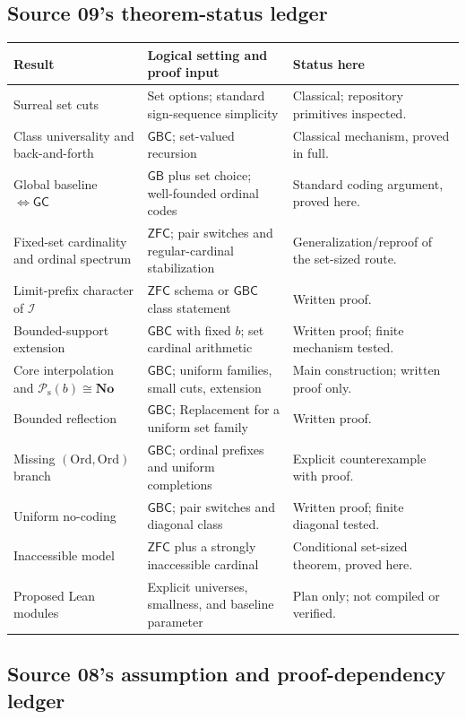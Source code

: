 \documentclass[11pt]{article}
\theoremstyle{definition}
\theoremstyle{remark}
\newcommand{\No}{\mathbf{No}}
\newcommand{\Ord}{\mathrm{Ord}}
\newcommand{\Words}{\mathcal I}
\newcommand{\Psupp}{\mathcal P_{\mathrm{s}}}
\newcommand{\GB}{\mathsf{GB}}
\newcommand{\GBC}{\mathsf{GBC}}
\newcommand{\ZFC}{\mathsf{ZFC}}
\newcommand{\GC}{\mathsf{GC}}
\begin{document}
\subsection{Source 09's theorem-status ledger}
{\small
\begin{longtable}{@{}p{}p{}p{}@{}}
\toprule
Result & Logical setting and proof input & Status here\\
\midrule\endhead
Surreal set cuts & Set options; standard sign-sequence simplicity & Classical; repository primitives inspected.\\
Class universality and back-and-forth & $\GBC$; set-valued recursion & Classical mechanism, proved in full.\\
Global baseline $\Leftrightarrow\GC$ & $\GB$ plus set choice; well-founded ordinal codes & Standard coding argument, proved here.\\
Fixed-set cardinality and ordinal spectrum & $\ZFC$; pair switches and regular-cardinal stabilization & Generalization/reproof of the set-sized route.\\
Limit-prefix character of $\Words$ & $\ZFC$ schema or $\GBC$ class statement & Written proof.\\
Bounded-support extension & $\GBC$ with fixed $b$; set cardinal arithmetic & Written proof; finite mechanism tested.\\
Core interpolation and $\Psupp(b)\cong\No$ & $\GBC$; uniform families, small cuts, extension & Main construction; written proof only.\\
Bounded reflection & $\GBC$; Replacement for a uniform set family & Written proof.\\
Missing $(\Ord,\Ord)$ branch & $\GBC$; ordinal prefixes and uniform completions & Explicit counterexample with proof.\\
Uniform no-coding & $\GBC$; pair switches and diagonal class & Written proof; finite diagonal tested.\\
Inaccessible model & $\ZFC$ plus a strongly inaccessible cardinal & Conditional set-sized theorem, proved here.\\
Proposed Lean modules & Explicit universes, smallness, and baseline parameter & Plan only; not compiled or verified.\\
\bottomrule
\end{longtable}
}

\subsection{Source 08's assumption and proof-dependency ledger}\label{swo:sk:app:ledger}
\end{document}
